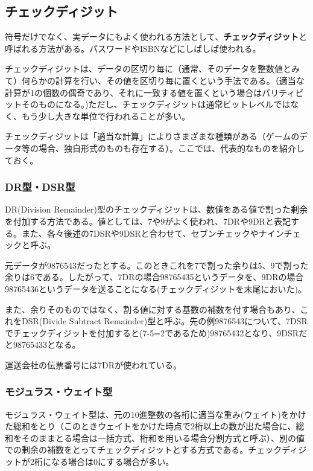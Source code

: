 \subsection{チェックディジット}
符号だけでなく、実データにもよく使われる方法として、\textbf{チェックディジット}と呼ばれる方法がある。パスワードやISBNなどにしばしば使われる。

チェックディジットは、データの区切り毎に（通常、そのデータを整数値とみて）何らかの計算を行い、その値を区切り毎に置くという手法である。（適当な計算が1の個数の偶奇であり、それに一致する値を置くという場合はパリティビットそのものになる。)ただし、チェックディジットは通常ビットレベルではなく、もう少し大きな単位で行われることが多い。

チェックディジットは「適当な計算」によりさまざまな種類がある（ゲームのデータ等の場合、独自形式のものも存在する）。ここでは、代表的なものを紹介しておく。
\subsubsection{DR型・DSR型}
DR(Division Remainder)型のチェックディジットは、数値をある値で割った剰余を付加する方法である。値としては、7や9がよく使われ、7DRや9DRと表記する。また、各々後述の7DSRや9DSRと合わせて、セブンチェックやナインチェックと呼ぶ。

元データが9876543だったとする。このときこれを7で割った余りは5、9で割った余りは6である。したがって、7DRの場合98765435というデータを、9DRの場合98765436というデータを送ることになる(チェックディジットを末尾においた)。

また、余りそのものではなく、割る値に対する基数の補数を付す場合もあり、これをDSR(Divide Subtract Remainder)型と呼ぶ。先の例9876543について、7DSRでチェックディジットを付加すると(7-5=2であるため)98765432となり、9DSRだと98765433となる。

運送会社の伝票番号には7DRが使われている。

\subsubsection{モジュラス・ウェイト型}
モジュラス・ウェイト型は、元の10進整数の各桁に適当な重み(ウェイト)をかけた総和をとり（このときウェイトをかけた時点で2桁以上の数が出た場合に、総和をそのままとる場合は一括方式、桁和を用いる場合分割方式と呼ぶ）、別の値での剰余の補数をとってチェックディジットとする方式である。チェックディジットが2桁になる場合は0にする場合が多い。

